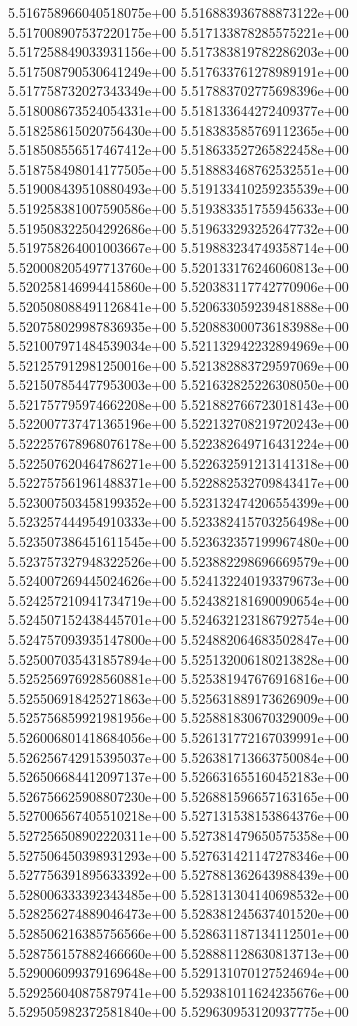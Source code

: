 5.516758966040518075e+00
5.516883936788873122e+00
5.517008907537220175e+00
5.517133878285575221e+00
5.517258849033931156e+00
5.517383819782286203e+00
5.517508790530641249e+00
5.517633761278989191e+00
5.517758732027343349e+00
5.517883702775698396e+00
5.518008673524054331e+00
5.518133644272409377e+00
5.518258615020756430e+00
5.518383585769112365e+00
5.518508556517467412e+00
5.518633527265822458e+00
5.518758498014177505e+00
5.518883468762532551e+00
5.519008439510880493e+00
5.519133410259235539e+00
5.519258381007590586e+00
5.519383351755945633e+00
5.519508322504292686e+00
5.519633293252647732e+00
5.519758264001003667e+00
5.519883234749358714e+00
5.520008205497713760e+00
5.520133176246060813e+00
5.520258146994415860e+00
5.520383117742770906e+00
5.520508088491126841e+00
5.520633059239481888e+00
5.520758029987836935e+00
5.520883000736183988e+00
5.521007971484539034e+00
5.521132942232894969e+00
5.521257912981250016e+00
5.521382883729597069e+00
5.521507854477953003e+00
5.521632825226308050e+00
5.521757795974662208e+00
5.521882766723018143e+00
5.522007737471365196e+00
5.522132708219720243e+00
5.522257678968076178e+00
5.522382649716431224e+00
5.522507620464786271e+00
5.522632591213141318e+00
5.522757561961488371e+00
5.522882532709843417e+00
5.523007503458199352e+00
5.523132474206554399e+00
5.523257444954910333e+00
5.523382415703256498e+00
5.523507386451611545e+00
5.523632357199967480e+00
5.523757327948322526e+00
5.523882298696669579e+00
5.524007269445024626e+00
5.524132240193379673e+00
5.524257210941734719e+00
5.524382181690090654e+00
5.524507152438445701e+00
5.524632123186792754e+00
5.524757093935147800e+00
5.524882064683502847e+00
5.525007035431857894e+00
5.525132006180213828e+00
5.525256976928560881e+00
5.525381947676916816e+00
5.525506918425271863e+00
5.525631889173626909e+00
5.525756859921981956e+00
5.525881830670329009e+00
5.526006801418684056e+00
5.526131772167039991e+00
5.526256742915395037e+00
5.526381713663750084e+00
5.526506684412097137e+00
5.526631655160452183e+00
5.526756625908807230e+00
5.526881596657163165e+00
5.527006567405510218e+00
5.527131538153864376e+00
5.527256508902220311e+00
5.527381479650575358e+00
5.527506450398931293e+00
5.527631421147278346e+00
5.527756391895633392e+00
5.527881362643988439e+00
5.528006333392343485e+00
5.528131304140698532e+00
5.528256274889046473e+00
5.528381245637401520e+00
5.528506216385756566e+00
5.528631187134112501e+00
5.528756157882466660e+00
5.528881128630813713e+00
5.529006099379169648e+00
5.529131070127524694e+00
5.529256040875879741e+00
5.529381011624235676e+00
5.529505982372581840e+00
5.529630953120937775e+00
